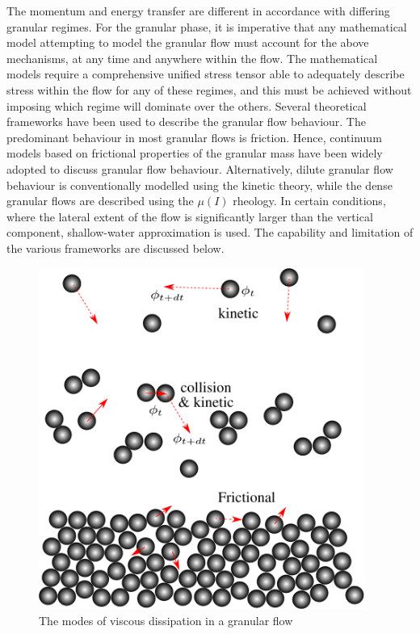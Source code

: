 The momentum and energy transfer are different in accordance with differing 
granular regimes. For the granular phase, it is 
imperative that any mathematical model attempting to model the granular flow 
must account for the above mechanisms, at any time and anywhere within the 
flow. The mathematical models require a comprehensive unified stress tensor 
able to adequately describe stress within the flow for any of these regimes, 
and this must be achieved without imposing which regime will dominate over the 
others. Several theoretical frameworks have been used to describe the granular 
flow behaviour. The predominant behaviour in most granular flows is friction. 
Hence, continuum models based on frictional properties of the granular mass 
have been widely adopted to discuss granular flow behaviour. Alternatively, 
dilute granular flow behaviour is conventionally modelled using the kinetic 
theory, while the dense granular flows are described using the $\mu(I)$ 
rheology. In certain conditions, where the lateral extent of the flow is 
significantly larger than the vertical component, shallow-water approximation 
is used. The capability and limitation of the various frameworks are discussed 
below. 
%
\begin{figure}[tbhp]
\centering
\includegraphics[width=0.95\textwidth]{kinetic}
\caption{The modes of viscous dissipation in a granular flow}
\label{fig:kinetic}
\end{figure}
%


